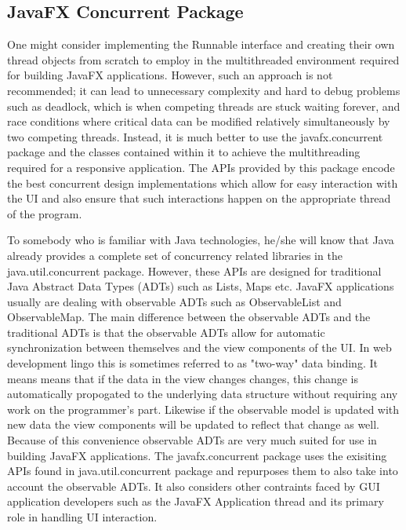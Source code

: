 \subsection{JavaFX Concurrent Package}
%
One might consider implementing the Runnable interface and creating their own thread objects from scratch to employ in the multithreaded environment required for building JavaFX applications. However, such an approach is not recommended; it can lead to unnecessary complexity and hard to debug problems such as deadlock, which is when competing threads are stuck waiting forever, and race conditions where critical data can be modified relatively simultaneously by two competing threads. Instead, it is much better to use the javafx.concurrent package and the classes contained within it to achieve the multithreading required for a responsive application. The APIs provided by this package encode the best concurrent design implementations which allow for easy interaction with the UI and also ensure that such interactions happen on the appropriate thread of the program. 

To somebody who is familiar with Java technologies, he/she will know that Java already provides a complete set of concurrency related libraries in the java.util.concurrent package. However, these APIs are designed for traditional Java Abstract Data Types (ADTs) such as Lists, Maps etc. JavaFX applications usually are dealing with observable ADTs such as ObservableList and ObservableMap. The main difference between the observable ADTs and the traditional ADTs is that the observable ADTs allow for automatic synchronization between themselves and the view components of the UI. In web development lingo this is sometimes referred to as "two-way" data binding. It means means that if the data in the view changes changes, this change is automatically propogated to the underlying data structure without requiring any work on the programmer's part. Likewise if the observable model is updated with new data the view components will be updated to reflect that change as well. Because of this convenience observable ADTs are very much suited for use in building JavaFX applications. The javafx.concurrent package uses the exisiting APIs found in java.util.concurrent package and repurposes them to also take into account the observable ADTs. It also considers other contraints faced by GUI application developers such as the JavaFX Application thread and its primary role in handling UI interaction. 

